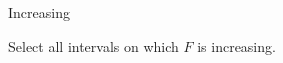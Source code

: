\documentclass{ximera}
\begin{document}
\begin{exercise} Increasing


Select all intervals on which $F$ is increasing.

\begin{selectAll}
\choice [correct]{$[-6,-5]$}
\choice {$[7,9]$}
\choice [correct]{$[0.1]$}
\choice [correct]{$[7,9)$}
\choice{$[-7,-5]$}
\end{selectAll}

\end{exercise}
\end{document}
